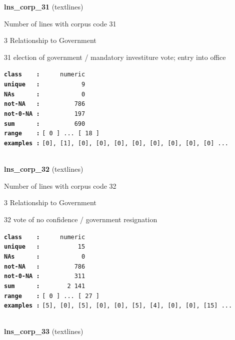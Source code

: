 \documentclass[]{article}
\begin{document}
\textbf{lns\_corp\_31} (textlines)

Number of lines with corpus code 31

3 Relationship to Government

31 election of government / mandatory investiture vote; entry into
office

\textbf{\texttt{class\ \ \ \ :}} \texttt{~~~~~numeric}\\
\textbf{\texttt{unique\ \ \ :}} \texttt{~~~~~~~~~~~9}\\
\textbf{\texttt{NAs\ \ \ \ \ \ :}} \texttt{~~~~~~~~~~~0}\\
\textbf{\texttt{not-NA\ \ \ :}} \texttt{~~~~~~~~~786}\\
\textbf{\texttt{not-0-NA\ :}} \texttt{~~~~~~~~~197}\\
\textbf{\texttt{sum\ \ \ \ \ \ :}} \texttt{~~~~~~~~~690}\\
\textbf{\texttt{range\ \ \ \ :}}
\texttt{{[}\ 0\ {]}\ ...\ {[}\ 18\ {]}}\\
\textbf{\texttt{examples\ :}}
\texttt{{[}0{]},\ {[}1{]},\ {[}0{]},\ {[}0{]},\ {[}0{]},\ {[}0{]},\ {[}0{]},\ {[}0{]},\ {[}0{]},\ {[}0{]}\ ...}\\

~

\textbf{lns\_corp\_32} (textlines)

Number of lines with corpus code 32

3 Relationship to Government

32 vote of no confidence / government resignation

\textbf{\texttt{class\ \ \ \ :}} \texttt{~~~~~numeric}\\
\textbf{\texttt{unique\ \ \ :}} \texttt{~~~~~~~~~~15}\\
\textbf{\texttt{NAs\ \ \ \ \ \ :}} \texttt{~~~~~~~~~~~0}\\
\textbf{\texttt{not-NA\ \ \ :}} \texttt{~~~~~~~~~786}\\
\textbf{\texttt{not-0-NA\ :}} \texttt{~~~~~~~~~311}\\
\textbf{\texttt{sum\ \ \ \ \ \ :}} \texttt{~~~~~~~2~141}\\
\textbf{\texttt{range\ \ \ \ :}}
\texttt{{[}\ 0\ {]}\ ...\ {[}\ 27\ {]}}\\
\textbf{\texttt{examples\ :}}
\texttt{{[}5{]},\ {[}0{]},\ {[}5{]},\ {[}0{]},\ {[}0{]},\ {[}5{]},\ {[}4{]},\ {[}0{]},\ {[}0{]},\ {[}15{]}\ ...}\\

~

\textbf{lns\_corp\_33} (textlines)
\end{document}
